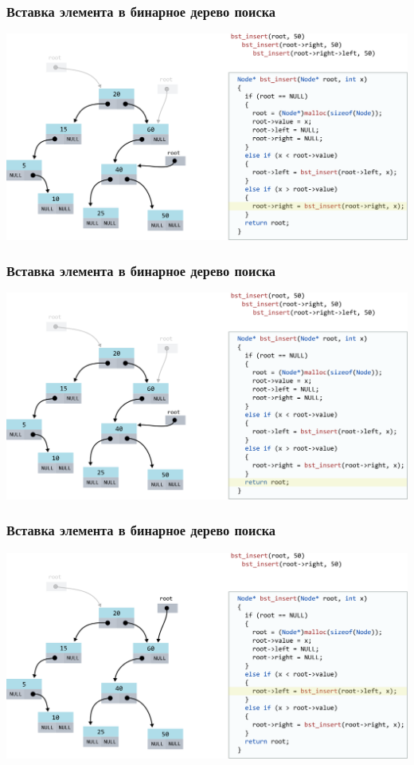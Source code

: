 \documentclass[10pt,pdf,hyperref={unicode}]{beamer}
\begin{document}
\begin{frame}[fragile]
\frametitle{Вставка элемента в бинарное дерево поиска}
\begin{center}
\includegraphics[scale=0.6]{images/tree/codetree/codetree17.png}
\end{center}
\end{frame}
\begin{frame}[fragile]
\frametitle{Вставка элемента в бинарное дерево поиска}
\begin{center}
\includegraphics[scale=0.6]{images/tree/codetree/codetree18.png}
\end{center}
\end{frame}
\begin{frame}[fragile]
\frametitle{Вставка элемента в бинарное дерево поиска}
\begin{center}
\includegraphics[scale=0.6]{images/tree/codetree/codetree19.png}
\end{center}
\end{frame}
\end{document}
